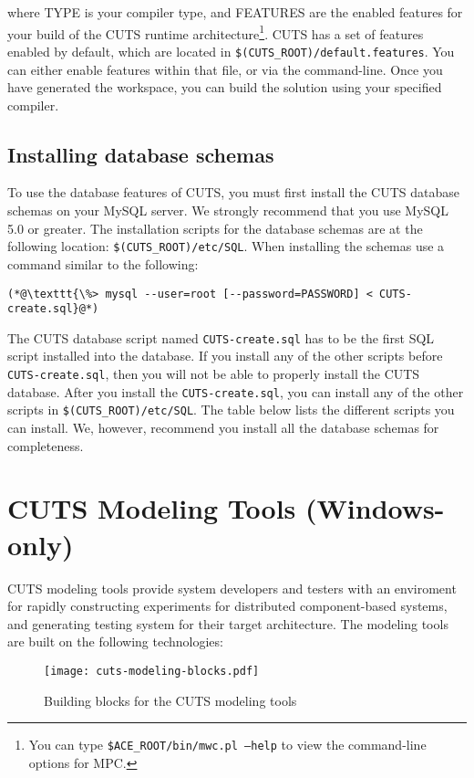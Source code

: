 \noindent where TYPE is your compiler type, and FEATURES are the enabled features
for your build of the CUTS runtime architecture\footnote{You can type 
\texttt{\$ACE\_ROOT/bin/mwc.pl --help} to view the command-line options for 
MPC.}. CUTS has a set of features enabled by default, which are located 
in \texttt{\$(CUTS\_ROOT)/default.features}. You can either enable features 
within that file, or via the command-line. Once you have generated the 
workspace, you can build the solution using your specified compiler.

\subsection{Installing database schemas}

To use the database features of CUTS, you must first install the CUTS database 
schemas on your MySQL server. We strongly recommend that you use MySQL 5.0 or 
greater. The installation scripts for the database schemas are at the following 
location: \texttt{\$(CUTS\_ROOT)/etc/SQL}. When installing the schemas use a 
command similar to the following:

\begin{lstlisting}
(*@\texttt{\%> mysql --user=root [--password=PASSWORD] < CUTS-create.sql}@*)
\end{lstlisting}

The CUTS database script named \texttt{CUTS-create.sql} has to be the first SQL 
script installed into the database. If you install any of the other scripts before
\texttt{CUTS-create.sql}, then you will not be able to properly install the CUTS 
database. After you install the \texttt{CUTS-create.sql}, you can install any of 
the other scripts in \texttt{\$(CUTS\_ROOT)/etc/SQL}. The table below lists the
different scripts you can install. We, however, recommend you install all the 
database schemas for completeness.

\section{CUTS Modeling Tools (Windows-only)}

CUTS modeling tools provide system developers and testers with an enviroment
for rapidly constructing experiments for distributed component-based systems,
and generating testing system for their target architecture. The modeling
tools are built on the following technologies:


\begin{figure}[htbp]
  \centering
  \texttt{[image: cuts-modeling-blocks.pdf]}
  \caption{Building blocks for the CUTS modeling tools}
  \label{fig:cuts-modeling-blocks}
\end{figure}


